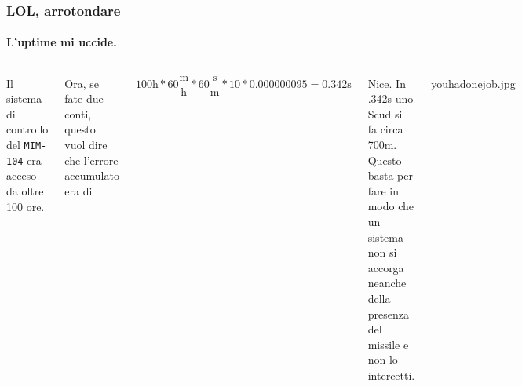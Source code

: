 \documentclass{beamer}
\begin{document}
	  \begin{frame}
	  		\frametitle{LOL, arrotondare}
	    \framesubtitle{L'uptime mi uccide.}
	  		
	  		
	    \begin{columns}
		  		Il sistema di controllo del \texttt{MIM-104} era acceso da oltre 100 ore.
		  		
		  		\vspace{2em}
		  		
		  		Ora, se fate due conti, questo vuol dire che l'errore accumulato era di
		  		
		  		$$100\text{h} * 60\frac{\text{m}}{\text{h}} * 60\frac{\text{s}}{\text{m}} * 10 * 0.000000095 = 0.342\text{s}$$
	    	    
	    	    \pause
		    Nice. In .342s uno Scud si fa circa 700m. Questo basta per fare in modo che un
				sistema non si accorga neanche della presenza del missile e non lo intercetti.
				
				youhadonejob.jpg
				  \begin{center}
			    		\includegraphics[width=.9\textwidth]{IMGs/Iaccidentally.png}
			    \end{center}
	    \end{columns}
	    
	  \end{frame}
	  
\end{document}
